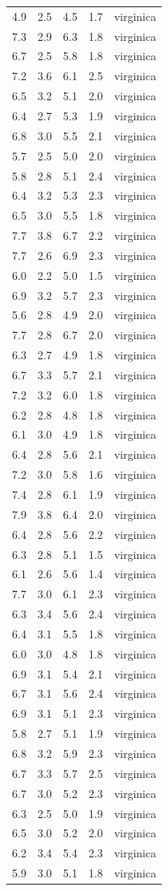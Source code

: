 \documentclass[
]{article}
\begin{document}
\begin{longtable}[]{@{}rrrrl@{}}
4.9 & 2.5 & 4.5 & 1.7 & virginica\tabularnewline
7.3 & 2.9 & 6.3 & 1.8 & virginica\tabularnewline
6.7 & 2.5 & 5.8 & 1.8 & virginica\tabularnewline
7.2 & 3.6 & 6.1 & 2.5 & virginica\tabularnewline
6.5 & 3.2 & 5.1 & 2.0 & virginica\tabularnewline
6.4 & 2.7 & 5.3 & 1.9 & virginica\tabularnewline
6.8 & 3.0 & 5.5 & 2.1 & virginica\tabularnewline
5.7 & 2.5 & 5.0 & 2.0 & virginica\tabularnewline
5.8 & 2.8 & 5.1 & 2.4 & virginica\tabularnewline
6.4 & 3.2 & 5.3 & 2.3 & virginica\tabularnewline
6.5 & 3.0 & 5.5 & 1.8 & virginica\tabularnewline
7.7 & 3.8 & 6.7 & 2.2 & virginica\tabularnewline
7.7 & 2.6 & 6.9 & 2.3 & virginica\tabularnewline
6.0 & 2.2 & 5.0 & 1.5 & virginica\tabularnewline
6.9 & 3.2 & 5.7 & 2.3 & virginica\tabularnewline
5.6 & 2.8 & 4.9 & 2.0 & virginica\tabularnewline
7.7 & 2.8 & 6.7 & 2.0 & virginica\tabularnewline
6.3 & 2.7 & 4.9 & 1.8 & virginica\tabularnewline
6.7 & 3.3 & 5.7 & 2.1 & virginica\tabularnewline
7.2 & 3.2 & 6.0 & 1.8 & virginica\tabularnewline
6.2 & 2.8 & 4.8 & 1.8 & virginica\tabularnewline
6.1 & 3.0 & 4.9 & 1.8 & virginica\tabularnewline
6.4 & 2.8 & 5.6 & 2.1 & virginica\tabularnewline
7.2 & 3.0 & 5.8 & 1.6 & virginica\tabularnewline
7.4 & 2.8 & 6.1 & 1.9 & virginica\tabularnewline
7.9 & 3.8 & 6.4 & 2.0 & virginica\tabularnewline
6.4 & 2.8 & 5.6 & 2.2 & virginica\tabularnewline
6.3 & 2.8 & 5.1 & 1.5 & virginica\tabularnewline
6.1 & 2.6 & 5.6 & 1.4 & virginica\tabularnewline
7.7 & 3.0 & 6.1 & 2.3 & virginica\tabularnewline
6.3 & 3.4 & 5.6 & 2.4 & virginica\tabularnewline
6.4 & 3.1 & 5.5 & 1.8 & virginica\tabularnewline
6.0 & 3.0 & 4.8 & 1.8 & virginica\tabularnewline
6.9 & 3.1 & 5.4 & 2.1 & virginica\tabularnewline
6.7 & 3.1 & 5.6 & 2.4 & virginica\tabularnewline
6.9 & 3.1 & 5.1 & 2.3 & virginica\tabularnewline
5.8 & 2.7 & 5.1 & 1.9 & virginica\tabularnewline
6.8 & 3.2 & 5.9 & 2.3 & virginica\tabularnewline
6.7 & 3.3 & 5.7 & 2.5 & virginica\tabularnewline
6.7 & 3.0 & 5.2 & 2.3 & virginica\tabularnewline
6.3 & 2.5 & 5.0 & 1.9 & virginica\tabularnewline
6.5 & 3.0 & 5.2 & 2.0 & virginica\tabularnewline
6.2 & 3.4 & 5.4 & 2.3 & virginica\tabularnewline
5.9 & 3.0 & 5.1 & 1.8 & virginica\tabularnewline
\bottomrule
\end{longtable}
\end{document}
